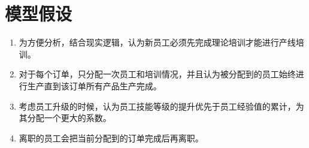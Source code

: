 \section{模型假设}
\begin{enumerate}
    \item 为方便分析，结合现实逻辑，认为新员工必须先完成理论培训才能进行产线培训。
    
    \item 对于每个订单，只分配一次员工和培训情况，并且认为被分配到的员工始终进行生产直到该订单所有产品生产完成。
    
    \item 考虑员工升级的时候，认为员工技能等级的提升优先于员工经验值的累计，为其分配一个更大的系数。
    
    \item 离职的员工会把当前分配到的订单完成后再离职。
\end{enumerate}

